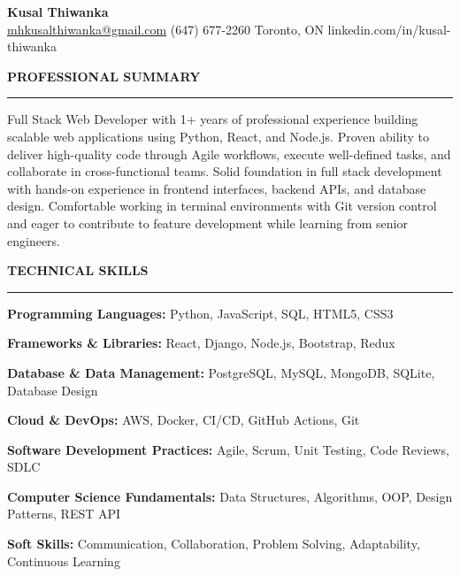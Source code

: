 \documentclass[10pt,letterpaper]{article}
\begin{document}
\begin{center}
{\LARGE\textbf{Kusal Thiwanka}}\\[3pt]
\href{mailto:mhkusalthiwanka@gmail.com}{mhkusalthiwanka@gmail.com}\hspace{2em}%
(647) 677{-}2260\hspace{2em}%
Toronto, ON\hspace{2em}
linkedin.com/in/kusal-thiwanka
\end{center}

\vspace{6pt}

\textbf{PROFESSIONAL SUMMARY}\\[-8pt]
\noindent\rule{\textwidth}{1pt}

\vspace{-2pt}

Full Stack Web Developer with 1+ years of professional experience building scalable web applications using Python, React, and Node.js. Proven ability to deliver high-quality code through Agile workflows, execute well-defined tasks, and collaborate in cross-functional teams. Solid foundation in full stack development with hands-on experience in frontend interfaces, backend APIs, and database design. Comfortable working in terminal environments with Git version control and eager to contribute to feature development while learning from senior engineers.

\vspace{8pt}

\textbf{TECHNICAL SKILLS}\\[-8pt]
\noindent\rule{\textwidth}{1pt}

\vspace{-2pt}

\textbf{Programming Languages:} Python, JavaScript, SQL, HTML5, CSS3

\textbf{Frameworks \& Libraries:} React, Django, Node.js, Bootstrap, Redux

\textbf{Database \& Data Management:} PostgreSQL, MySQL, MongoDB, SQLite, Database Design

\textbf{Cloud \& DevOps:} AWS, Docker, CI/CD, GitHub Actions, Git

\textbf{Software Development Practices:} Agile, Scrum, Unit Testing, Code Reviews, SDLC

\textbf{Computer Science Fundamentals:} Data Structures, Algorithms, OOP, Design Patterns, REST API

\textbf{Soft Skills:} Communication, Collaboration, Problem Solving, Adaptability, Continuous Learning
\end{document}
